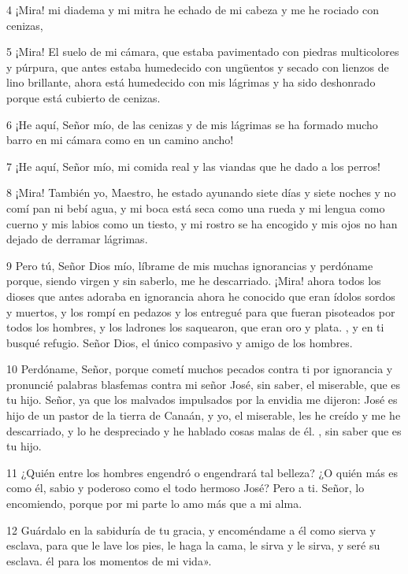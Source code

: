 \par 4 ¡Mira! mi diadema y mi mitra he echado de mi cabeza y me he rociado con cenizas,

\par 5 ¡Mira! El suelo de mi cámara, que estaba pavimentado con piedras multicolores y púrpura, que antes estaba humedecido con ungüentos y secado con lienzos de lino brillante, ahora está humedecido con mis lágrimas y ha sido deshonrado porque está cubierto de cenizas.

\par 6 ¡He aquí, Señor mío, de las cenizas y de mis lágrimas se ha formado mucho barro en mi cámara como en un camino ancho!

\par 7 ¡He aquí, Señor mío, mi comida real y las viandas que he dado a los perros!

\par 8 ¡Mira! También yo, Maestro, he estado ayunando siete días y siete noches y no comí pan ni bebí agua, y mi boca está seca como una rueda y mi lengua como cuerno y mis labios como un tiesto, y mi rostro se ha encogido y mis ojos no han dejado de derramar lágrimas.

\par 9 Pero tú, Señor Dios mío, líbrame de mis muchas ignorancias y perdóname porque, siendo virgen y sin saberlo, me he descarriado. ¡Mira! ahora todos los dioses que antes adoraba en ignorancia ahora he conocido que eran ídolos sordos y muertos, y los rompí en pedazos y los entregué para que fueran pisoteados por todos los hombres, y los ladrones los saquearon, que eran oro y plata. , y en ti busqué refugio. Señor Dios, el único compasivo y amigo de los hombres.

\par 10 Perdóname, Señor, porque cometí muchos pecados contra ti por ignorancia y pronuncié palabras blasfemas contra mi señor José, sin saber, el miserable, que es tu hijo. Señor, ya que los malvados impulsados ​​por la envidia me dijeron: José es hijo de un pastor de la tierra de Canaán, y yo, el miserable, les he creído y me he descarriado, y lo he despreciado y he hablado cosas malas de él. , sin saber que es tu hijo.

\par 11 ¿Quién entre los hombres engendró o engendrará tal belleza? ¿O quién más es como él, sabio y poderoso como el todo hermoso José? Pero a ti. Señor, lo encomiendo, porque por mi parte lo amo más que a mi alma.

\par 12 Guárdalo en la sabiduría de tu gracia, y encoméndame a él como sierva y esclava, para que le lave los pies, le haga la cama, le sirva y le sirva, y seré su esclava. él para los momentos de mi vida».

